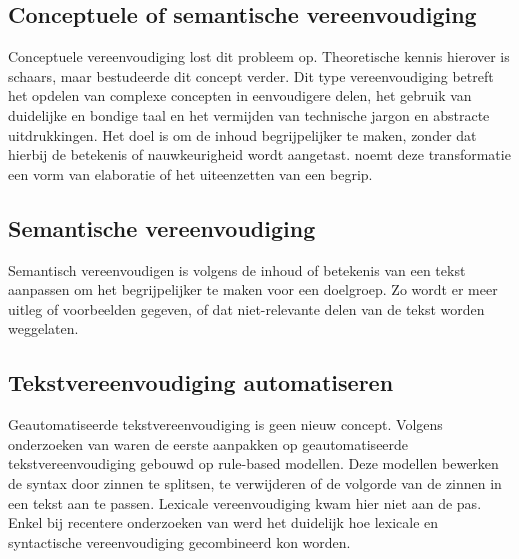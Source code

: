 

\subsection{Conceptuele of semantische vereenvoudiging}

Conceptuele vereenvoudiging lost dit probleem op. Theoretische kennis hierover is schaars, maar \textcite{Siddharthan2006} bestudeerde dit concept verder. Dit type vereenvoudiging betreft het opdelen van complexe concepten in eenvoudigere delen, het gebruik van duidelijke en bondige taal en het vermijden van technische jargon en abstracte uitdrukkingen. Het doel is om de inhoud begrijpelijker te maken, zonder dat hierbij de betekenis of nauwkeurigheid wordt aangetast. \textcite{Siddharthan2006} noemt deze transformatie een vorm van elaboratie of het uiteenzetten van een begrip.

\subsection{Semantische vereenvoudiging}

Semantisch vereenvoudigen is volgens \textcite{Siddharthan2006} de inhoud of betekenis van een tekst aanpassen om het begrijpelijker te maken voor een doelgroep. Zo wordt er meer uitleg of voorbeelden gegeven, of dat niet-relevante delen van de tekst worden weggelaten. 

\subsection{Tekstvereenvoudiging automatiseren}

Geautomatiseerde tekstvereenvoudiging is geen nieuw concept. Volgens onderzoeken van \textcite{Canning2000, Siddharthan2006} waren de eerste aanpakken op geautomatiseerde tekstvereenvoudiging gebouwd op rule-based modellen. Deze modellen bewerken de syntax door zinnen te splitsen, te verwijderen of de volgorde van de zinnen in een tekst aan te passen. Lexicale vereenvoudiging kwam hier niet aan de pas. Enkel bij recentere onderzoeken van \textcite{Coster2011, Bulte2018} werd het duidelijk hoe lexicale en syntactische vereenvoudiging gecombineerd kon worden.

